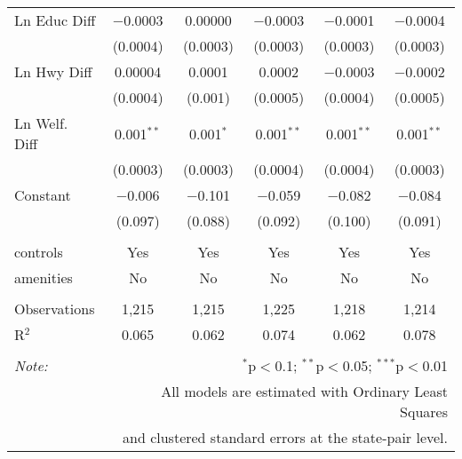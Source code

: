 \begin{table}[!htbp]
\begin{tabular}{@{\extracolsep{5pt}}lccccc}
  Ln Educ Diff & $-$0.0003 & 0.00000 & $-$0.0003 & $-$0.0001 & $-$0.0004 \\ 
  & (0.0004) & (0.0003) & (0.0003) & (0.0003) & (0.0003) \\ 
  Ln Hwy Diff & 0.00004 & 0.0001 & 0.0002 & $-$0.0003 & $-$0.0002 \\ 
  & (0.0004) & (0.001) & (0.0005) & (0.0004) & (0.0005) \\ 
  Ln Welf. Diff & 0.001$^{**}$ & 0.001$^{*}$ & 0.001$^{**}$ & 0.001$^{**}$ & 0.001$^{**}$ \\ 
  & (0.0003) & (0.0003) & (0.0004) & (0.0004) & (0.0003) \\ 
  Constant & $-$0.006 & $-$0.101 & $-$0.059 & $-$0.082 & $-$0.084 \\ 
  & (0.097) & (0.088) & (0.092) & (0.100) & (0.091) \\ 
 \hline \\[-1.8ex] 
controls & Yes & Yes & Yes & Yes & Yes \\ 
amenities & No & No & No & No & No \\ 
\hline \\[-1.8ex] 
Observations & 1,215 & 1,215 & 1,225 & 1,218 & 1,214 \\ 
R$^{2}$ & 0.065 & 0.062 & 0.074 & 0.062 & 0.078 \\ 
\hline 
\hline \\[-1.8ex] 
\textit{Note:}  & \multicolumn{5}{r}{$^{*}$p$<$0.1; $^{**}$p$<$0.05; $^{***}$p$<$0.01} \\ 
 & \multicolumn{5}{r}{All models are estimated with Ordinary Least Squares} \\ 
 & \multicolumn{5}{r}{and clustered standard errors at the state-pair level.} \\ 
\end{tabular} 
\end{table} 
